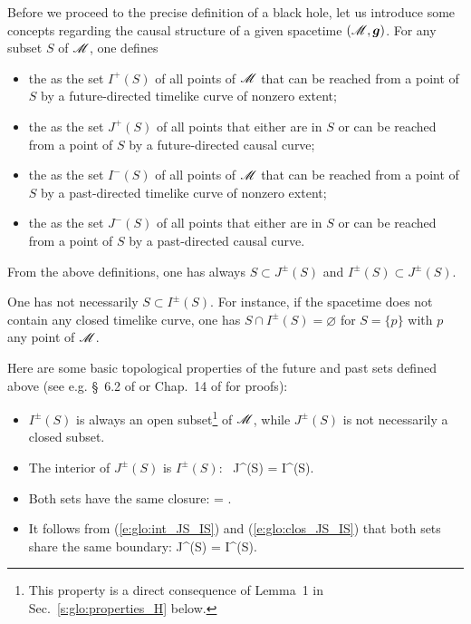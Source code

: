 Before we proceed to the precise definition of a black hole, let us introduce
some concepts regarding the causal structure of a given spacetime $(\mathscr{M},\bm{g})$.
For any subset $S$ of $\mathscr{M}$, one defines
\begin{itemize}
\item the  as the set $I^+(S)$ of all
points of $\mathscr{M}$ that can be reached from a point of $S$ by a future-directed
timelike curve of nonzero extent;
\item the  as the set $J^+(S)$ of
all points that either are in $S$ or can be reached from a point of $S$ by a future-directed
causal curve;
\item the  as the set $I^-(S)$ of all
points of $\mathscr{M}$ that can be reached from a point of $S$ by a past-directed
timelike curve of nonzero extent;
\item the  as the set $J^-(S)$ of
all points that either are in $S$ or can be reached from a point of $S$ by a past-directed
causal curve.
\end{itemize}
From the above definitions, one has always $S \subset J^\pm(S)$ and
$I^\pm(S) \subset J^\pm(S)$.

\begin{remark}
One has not necessarily $S \subset I^\pm(S)$. For instance,
if the spacetime does not contain
any closed timelike curve, one has  $S \cap I^\pm(S) = \varnothing$ for
$S = \{p\}$ with $p$ any point of $\mathscr{M}$.
\end{remark}

Here are some basic topological properties of the future and past sets
defined above (see e.g. \S~6.2 of \cite{HawkiE73} or Chap.~14 of
\cite{ONeil83} for proofs):
\begin{itemize}
\item
$I^\pm(S)$ is always an open subset\footnote{This property is a direct
consequence of Lemma~1 in Sec.~\ref{s:glo:properties_H} below.} of $\mathscr{M}$, while
$J^\pm(S)$ is not necessarily a closed subset.
\item The interior of $J^\pm(S)$ is $I^\pm(S)$:
\be \label{e:glo:int_JS_IS}
    \, J^\pm(S) = I^\pm(S).
\ee
\item Both sets have the same closure:
\be \label{e:glo:clos_JS_IS}
     =  .
\ee
\item
It follows from (\ref{e:glo:int_JS_IS}) and (\ref{e:glo:clos_JS_IS})
that both sets share the same boundary:
\be \label{e:glo:boundary_JS_IS}
    \partial J^\pm(S) = \partial I^\pm(S).
\ee
\end{itemize}

